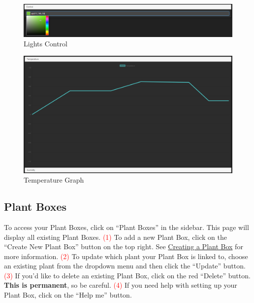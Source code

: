 \documentclass{article}
\begin{document}
	\begin{figure}[H]
		\includegraphics[width=\textwidth]{../images/UserManual/lights.png}
		\caption{Lights Control}
	\end{figure}	
	
	\begin{figure}[H]
		\includegraphics[width=\textwidth]{../images/UserManual/temperature.png}
		\caption{Temperature Graph}
	\end{figure}
	
\cleardoublepage

	\subsection{Plant Boxes}
	To access your Plant Boxes, click on ``Plant Boxes'' in the sidebar. This page will display all existing Plant Boxes.
	\newline
	\textcolor{red}{(1)} To add a new Plant Box, click on the ``Create New Plant Box'' button on the top right. See \hyperref[sec:creating-a-plant-box]{Creating a Plant Box} for more information.
	\newline
	\textcolor{red}{(2)} To update which plant your Plant Box is linked to, choose an existing plant from the dropdown menu and then click the ``Update'' button.
	\newline
	\textcolor{red}{(3)} If you'd like to delete an existing Plant Box, click on the red ``Delete'' button. \textbf{This is permanent}, so be careful.  
	\newline
	\textcolor{red}{(4)} If you need help with setting up your Plant Box, click on the ``Help me'' button.	
	
\end{document}
